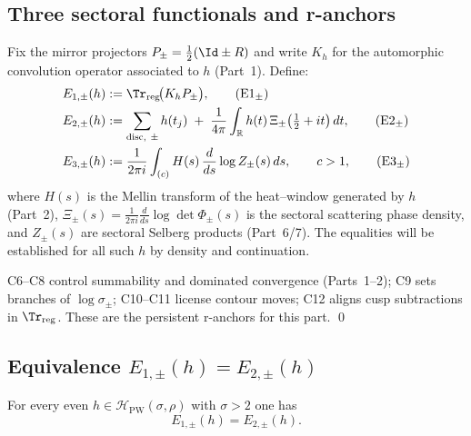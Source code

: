 \subsection{Three sectoral functionals and r-anchors}
\label{subsec:ch6-part3-triple} \relax \hspace{0pt}
Fix the mirror projectors $P_\pm=\tfrac12(\Id\pm R)$ and write $K_h$ for the automorphic convolution operator associated to $h$ (Part~1). Define: %
\begin{align}
E_{1,\pm}(h)
&:= \Tr_{\mathrm{reg}}\!\big(K_h P_\pm\big), 
\label{eq:E1-def} \tag{E1$_\pm$} \\
E_{2,\pm}(h)
&:= \sum_{\mathrm{disc,\ \pm}} h(t_j)
\;+\;\frac{1}{4\pi}\int_{\mathbb R} h(t)\,\Xi_\pm\!\left(\tfrac12+it\right)dt,
\label{eq:E2-def} \tag{E2$_\pm$}\\
E_{3,\pm}(h)
&:= \frac{1}{2\pi i}\int_{(c)} H(s)\,\frac{d}{ds}\log Z_\pm(s)\,ds,
\qquad c>1,
\label{eq:E3-def} \tag{E3$_\pm$}
\end{align}
where $H(s)$ is the Mellin transform of the heat–window generated by $h$ (Part~2), $\Xi_\pm(s)=\tfrac{1}{2\pi i}\frac{d}{ds}\log\det\Phi_\pm(s)$ is the sectoral scattering phase density, and $Z_\pm(s)$ are sectoral Selberg products (Part~6/7). The equalities will be established for all such $h$ by density and continuation.  %

\begin{remark}
\label{rem:placement}
C6–C8 control summability and dominated convergence (Parts~1–2); C9 sets branches of $\log\sigma_\pm$; C10–C11 license contour moves; C12 aligns cusp subtractions in $\Tr_{\mathrm{reg}}$. These are the persistent r-anchors for this part. \qed %
\end{remark}


\subsection{Equivalence $E_{1,\pm}(h)=E_{2,\pm}(h)$}
\label{subsec:ch6-part3-E1E2} \relax \hspace{0pt}
\begin{theorem}
\label{thm:E1=E2}
For every even $h\in\mathcal H_{\mathrm{PW}}(\sigma,\rho)$ with $\sigma>2$ one has
\[
E_{1,\pm}(h)=E_{2,\pm}(h).
\]
\end{theorem}


